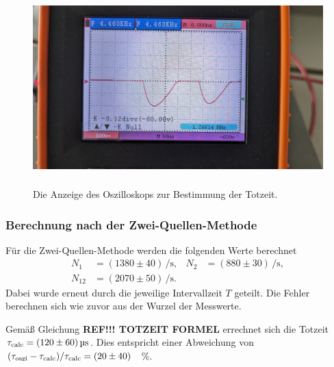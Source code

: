\begin{figure}[H]
    \centering
    \includegraphics[height = 7.5cm]{Abbildungen/totzeit.jpg}
    \caption{Die Anzeige des Oszilloskops zur Bestimmung der Totzeit.}
    \label{fig:totzeit_oszi}
\end{figure}

\subsubsection[]{Berechnung nach der Zwei-Quellen-Methode}
Für die Zwei-Quellen-Methode werden die folgenden Werte berechnet
\begin{align*}
    N_1 &= (1380 \pm 40) \, \unit{\per\second}, &
    N_2 &=  (880 \pm 30) \, \unit{\per\second}, \\
    N_{12} &= (2070 \pm 50) \, \unit{\per\second}.
\end{align*}
Dabei wurde erneut durch die jeweilige Intervallzeit $T$ geteilt.
Die Fehler berechnen sich wie zuvor aus der Wurzel der Messwerte.

\noindent
Gemäß Gleichung \textbf{REF!!! TOTZEIT FORMEL} errechnet sich die Totzeit $\tau_\text{calc} = \qty[]{120 +- 60}{\micro\second}$.
Dies entspricht einer Abweichung von $(\tau_\text{oszi} - \tau_\text{calc}) / \tau_\text{calc} = (\num[]{20+-40})$ \, \%.

